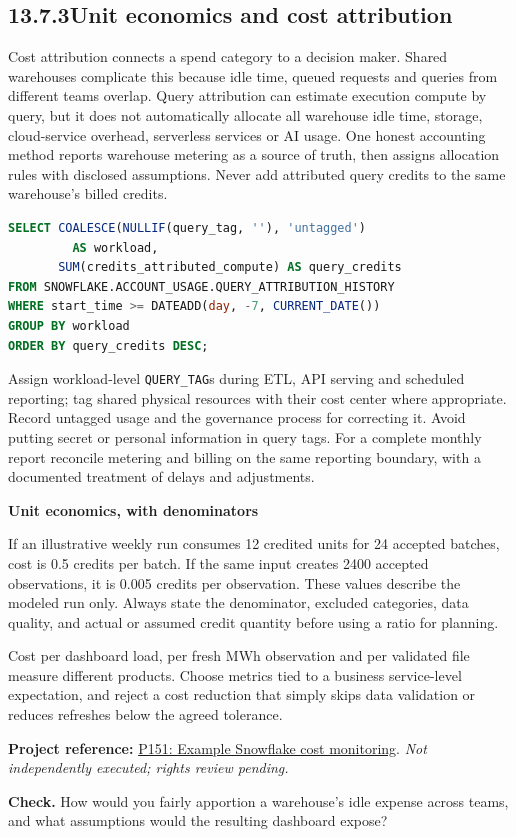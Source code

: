 \documentclass[11pt,twoside]{article}
\newcommand{\topic}[2]{\subsection*{#1\quad #2}}
\newcommand{\repo}[2]{\par\begingroup\fontsize{8.0}{9.6}\selectfont\sffamily\color{inkgray}\textbf{Project reference:} \href{#2}{#1}. \textit{Not independently executed; rights review pending.}\par\endgroup}
\begin{document}
\newpage
\topic{13.7.3}{Unit economics and cost attribution}
Cost attribution connects a spend category to a decision maker. Shared warehouses complicate this because idle time, queued requests and queries from different teams overlap. Query attribution can estimate execution compute by query, but it does not automatically allocate all warehouse idle time, storage, cloud-service overhead, serverless services or AI usage. One honest accounting method reports warehouse metering as a source of truth, then assigns allocation rules with disclosed assumptions. Never add attributed query credits to the same warehouse's billed credits.
\begin{lstlisting}[language=SQL,caption={Separate per-query attributed compute, not an extra charge.}]
SELECT COALESCE(NULLIF(query_tag, ''), 'untagged')
         AS workload,
       SUM(credits_attributed_compute) AS query_credits
FROM SNOWFLAKE.ACCOUNT_USAGE.QUERY_ATTRIBUTION_HISTORY
WHERE start_time >= DATEADD(day, -7, CURRENT_DATE())
GROUP BY workload
ORDER BY query_credits DESC;
\end{lstlisting}
Assign workload-level \texttt{QUERY\_TAG}s during ETL, API serving and scheduled reporting; tag shared physical resources with their cost center where appropriate. Record untagged usage and the governance process for correcting it. Avoid putting secret or personal information in query tags. For a complete monthly report reconcile metering and billing on the same reporting boundary, with a documented treatment of delays and adjustments.

\begin{whitebox}\textbf{Unit economics, with denominators}\par
If an illustrative weekly run consumes 12 credited units for 24 accepted batches, cost is 0.5 credits per batch. If the same input creates 2400 accepted observations, it is 0.005 credits per observation. These values describe the modeled run only. Always state the denominator, excluded categories, data quality, and actual or assumed credit quantity before using a ratio for planning.
\end{whitebox}
Cost per dashboard load, per fresh MWh observation and per validated file measure different products. Choose metrics tied to a business service-level expectation, and reject a cost reduction that simply skips data validation or reduces refreshes below the agreed tolerance.
\repo{P151: Example Snowflake cost monitoring}{https://github.com/Matatika/example-snowflake-cost-monitoring}
\textbf{Check.} How would you fairly apportion a warehouse's idle expense across teams, and what assumptions would the resulting dashboard expose?
\newpage
\end{document}
